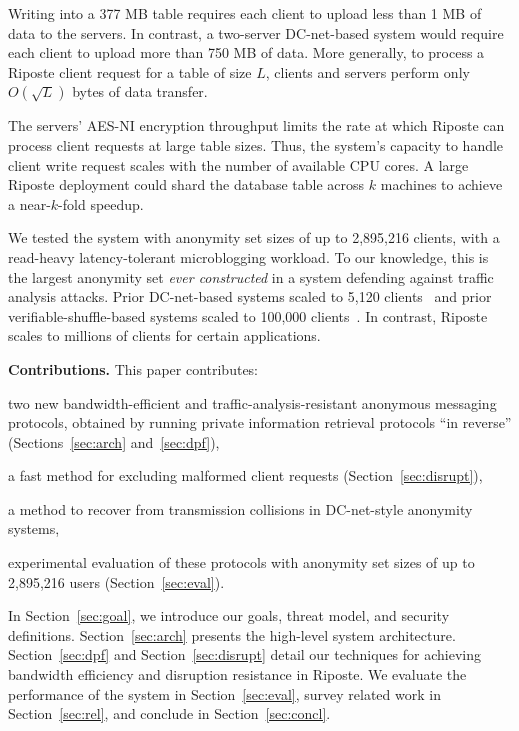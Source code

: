 \documentclass[10pt,twocolumn]{article}
\newcommand{\nicepara}[1]{\medskip\noindent\textbf{#1.}}
\newcommand{\name}{Riposte\xspace}
\begin{document}
Writing into a 377 MB table requires
each client to upload less than 1 MB of data to the servers.
In contrast, a two-server DC-net-based system would 
require each client to upload more than 750 MB of data.
More generally, to process a \name client request for a table of size $L$,
clients and servers perform only $O(\sqrt{L})$ bytes of data transfer.

The servers' AES-NI encryption throughput limits the 
rate at which \name can process client requests at large table sizes.
Thus, the system's capacity to handle client write request scales
with the number of available CPU cores.
A large \name deployment could shard the database table across
$k$ machines to achieve a near-$k$-fold speedup.

We tested the system with anonymity set sizes of up to
2,895,216 clients, with a read-heavy latency-tolerant
microblogging workload.
To our knowledge, this is the largest anonymity set 
{\em ever constructed} in a system defending against 
traffic analysis attacks.
Prior DC-net-based systems scaled to 5,120 clients~\cite{wolinsky2012dissent}
and prior verifiable-shuffle-based systems 
scaled to 100,000 clients~\cite{bayer2012efficient}.
In contrast, \name scales to millions of clients for
certain applications.


\nicepara{Contributions}
This paper contributes:
\begin{compactitem}
  \item two new bandwidth-efficient and traffic-analysis-resistant 
        anonymous messaging protocols, 
        obtained by running private information retrieval 
        protocols ``in reverse'' (Sections~\ref{sec:arch} and~\ref{sec:dpf}),
  \item a fast method for excluding
        malformed client requests 
        (Section~\ref{sec:disrupt}), 
  \item a method to recover from transmission 
        collisions in DC-net-style anonymity systems, 
  \item experimental evaluation of these protocols with anonymity 
        set sizes of up to 2,895,216 users (Section~\ref{sec:eval}).
\end{compactitem}

\medskip
In Section~\ref{sec:goal}, we introduce our goals,
threat model, and security definitions.
Section~\ref{sec:arch} presents the high-level system
architecture. 
Section~\ref{sec:dpf} and Section~\ref{sec:disrupt}
detail our techniques for achieving bandwidth efficiency 
and disruption resistance in \name.
We evaluate the performance of the system in Section~\ref{sec:eval},
survey related work in Section~\ref{sec:rel}, and conclude
in Section~\ref{sec:concl}.
\end{document}
